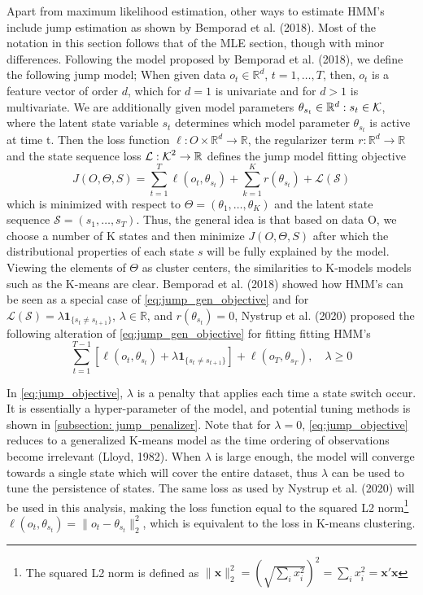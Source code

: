 Apart from maximum likelihood estimation, other ways to estimate HMM's include jump estimation as shown by Bemporad et al. (2018). Most of the notation in this section follows that of the MLE section, though with minor differences. Following the model proposed by Bemporad et al. (2018), we define the following jump model; When given data $o_t\in \mathbb{R}^d$, $t=1,\ldots,T$, then, $o_t$ is a feature vector of order $d$, which for $d=1$ is univariate and for $d>1$ is multivariate. We are additionally given model parameters $\theta_{s_t}\in \mathbb{R}^d:s_t\in\operatorname{\mathcal{K}}$, where the latent state variable $s_t$ determines which model parameter $\theta_{s_t}$ is active at time t. Then the loss function $\ell: O\times\mathbb{R}^d \rightarrow\mathbb{R}$, the regularizer term $r: \mathbb{R}^d \rightarrow \mathbb{R}$ and the state sequence loss $\mathcal{L}:\operatorname{\mathcal{K}}^2 \rightarrow \mathbb{R}$ defines the jump model fitting objective
\begin{equation}
    J(O, \Theta, S) = \sum_{t=1}^T \ell(o_t,\theta_{s_t}) + \sum_{k=1}^K r(\theta_{s_t}) + \mathcal{L(S)}
\label{eq:jump_gen_objective}    
\end{equation}
which is minimized with respect to $\Theta=(\theta_1,\ldots,\theta_K)$ and the latent state sequence $\mathcal{S}=(s_1,\ldots,s_T)$. Thus, the general idea is that based on data O, we choose a number of K states and then minimize $J(O, \Theta, S)$ after which the distributional properties of each state $s$ will be fully explained by the model. Viewing the elements of $\Theta$ as cluster centers, the similarities to K-models models such as the K-means are clear. Bemporad et al. (2018) showed how HMM's can be seen as a special case of \cref{eq:jump_gen_objective} and for $\mathcal{L(S)} = \lambda\mathbf{1}_{\{ s_t\ne s_{t+1}\}}$, $\lambda \in \mathbb{R}$, and $r(\theta_{s_t})=0$, Nystrup et al. (2020) proposed the following alteration of \cref{eq:jump_gen_objective} for fitting fitting HMM's
\begin{equation}
    \sum_{t=1}^{T-1}[\ell(o_t, \theta_{s_t}) + \lambda\mathbf{1}_{\{ s_t\ne s_{t+1} \}}]
    + \ell(o_T, \theta_{s_T})
    ,\quad \lambda \geq 0
\label{eq:jump_objective}
\end{equation}

In \cref{eq:jump_objective}, $\lambda$ is a penalty that applies each time a state switch occur. It is essentially a hyper-parameter of the model, and potential tuning methods is shown in \cref{subsection: jump_penalizer}. Note that for $\lambda=0$, \cref{eq:jump_objective} reduces to a generalized K-means model as the time ordering of observations become irrelevant (Lloyd, 1982). When $\lambda$ is large enough, the model will converge towards a single state which will cover the entire dataset, thus $\lambda$ can be used to tune the persistence of states. The same loss as used by Nystrup et al. (2020) will be used in this analysis, making the loss function equal to the squared L2 norm\footnote{The squared L2 norm is defined as $\|\mathbf{x}\|_2^2 = (\sqrt{\sum_i x_i^2})^2 = \sum_i x_i^2 = \mathbf{x'x} $} $\ell(o_t, \theta_{s_t}) = \| o_t - \theta_{s_t} \|_2^2$, which is equivalent to the loss in K-means clustering.

